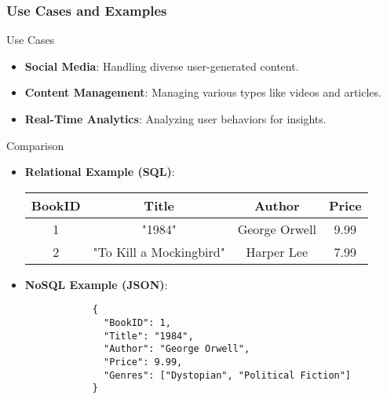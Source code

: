 \documentclass[aspectratio=169]{beamer}
\begin{document}
\begin{frame}[fragile]
    \frametitle{Use Cases and Examples}
    \begin{block}{Use Cases}
        \begin{itemize}
            \item \textbf{Social Media}: Handling diverse user-generated content.
            \item \textbf{Content Management}: Managing various types like videos and articles.
            \item \textbf{Real-Time Analytics}: Analyzing user behaviors for insights.
        \end{itemize}
    \end{block}
    
    \begin{block}{Comparison}
        \begin{itemize}
            \item \textbf{Relational Example (SQL)}:
            \begin{center}
                \begin{tabular}{|c|c|c|c|}
                    \hline
                    BookID & Title & Author & Price \\
                    \hline
                    1 & "1984" & George Orwell & 9.99 \\
                    2 & "To Kill a Mockingbird" & Harper Lee & 7.99 \\
                    \hline
                \end{tabular}
            \end{center}
            \item \textbf{NoSQL Example (JSON)}:
            \begin{lstlisting}
            {
              "BookID": 1,
              "Title": "1984",
              "Author": "George Orwell",
              "Price": 9.99,
              "Genres": ["Dystopian", "Political Fiction"]
            }
            \end{lstlisting}
        \end{itemize}
    \end{block}
\end{frame}
\end{document}
